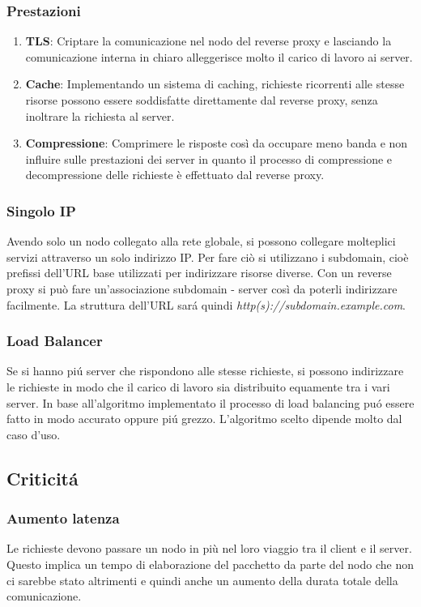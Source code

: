 \subsubsection{Prestazioni}
\begin{enumerate}
  \item \textbf{TLS}: Criptare la comunicazione nel nodo del reverse proxy e lasciando la comunicazione interna in chiaro alleggerisce molto il carico di lavoro ai server.
  \item \textbf{Cache}: Implementando un sistema di caching, richieste ricorrenti alle stesse risorse possono essere soddisfatte direttamente dal reverse proxy, senza inoltrare la richiesta al server.
  \item \textbf{Compressione}: Comprimere le risposte così da occupare meno banda e non influire sulle prestazioni dei server in quanto il processo di compressione e decompressione delle richieste è effettuato dal reverse proxy.
\end{enumerate}

\subsubsection{Singolo IP}
Avendo solo un nodo collegato alla rete globale, si possono collegare molteplici servizi attraverso un solo indirizzo IP. Per fare ciò si utilizzano i subdomain, cioè prefissi dell'URL base utilizzati per indirizzare risorse diverse. Con un reverse proxy si può fare un'associazione subdomain - server così da poterli indirizzare facilmente. La struttura dell'URL sará quindi \textit{http(s)://subdomain.example.com}.

\subsubsection{Load Balancer}
Se si hanno piú server che rispondono alle stesse richieste, si possono indirizzare le richieste in modo che il carico di lavoro sia distribuito equamente tra i vari server. In base all'algoritmo implementato il processo di load balancing puó essere fatto in modo accurato oppure piú grezzo. L'algoritmo scelto dipende molto dal caso d'uso.

\subsection{Criticitá}
\cite{risks}
\subsubsection{Aumento latenza}
Le richieste devono passare un nodo in più nel loro viaggio tra il client e il server. Questo implica un tempo di elaborazione del pacchetto da parte del nodo che non ci sarebbe stato altrimenti e quindi anche un aumento della durata totale della comunicazione.
